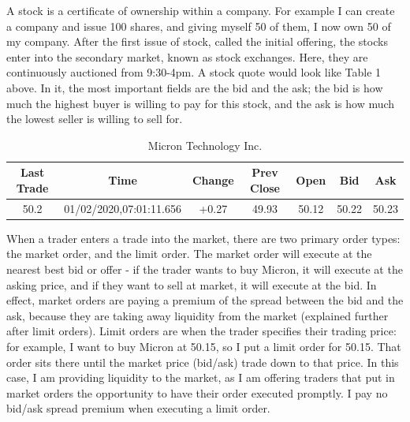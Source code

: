 \documentclass[14pt]{extarticle}
\begin{document}
A stock is a certificate of ownership within a company. For example I can create a company and issue 100 shares, and giving myself 50 of them, I now own 50 of my company. After the first issue of stock, called the initial offering, the stocks enter into the secondary market, known as stock exchanges. Here, they are continuously auctioned from 9:30-4pm. A stock quote would look like Table 1 above. In it, the most important fields are the bid and the ask; the bid is how much the highest buyer is willing to pay for this stock, and the ask is how much the lowest seller is willing to sell for. \\
\begin{table}%
\centering
\caption{Micron Technology Inc.}
 \begin{tabular}{||c c c c c c c||}
 \hline
 Last Trade & Time & Change & Prev Close & Open & Bid & Ask \\ [0.5ex] 
 \hline\hline
 50.2 & 01/02/2020,07:01:11.656 & +0.27 & 49.93 & 50.12 & 50.22 & 50.23 \\ [1ex] 
 \hline
 \end{tabular}
\end{table}

When a trader enters a trade into the market, there are two primary order types: the market order, and the limit order. The market order will execute at the nearest best bid or offer - if the trader wants to buy Micron, it will execute at the asking price, and if they want to sell at market, it will execute at the bid. In effect, market orders are paying a premium of the spread between the bid and the ask, because they are taking away liquidity from the market (explained further after limit orders). Limit orders are when the trader specifies their trading price: for example, I want to buy Micron at 50.15, so I put a limit order for 50.15. That order sits there until the market price (bid/ask) trade down to that price. In this case, I am providing liquidity to the market, as I am offering traders that put in market orders the opportunity to have their order executed promptly. I pay no bid/ask spread premium when executing a limit order.\\
\end{document}
